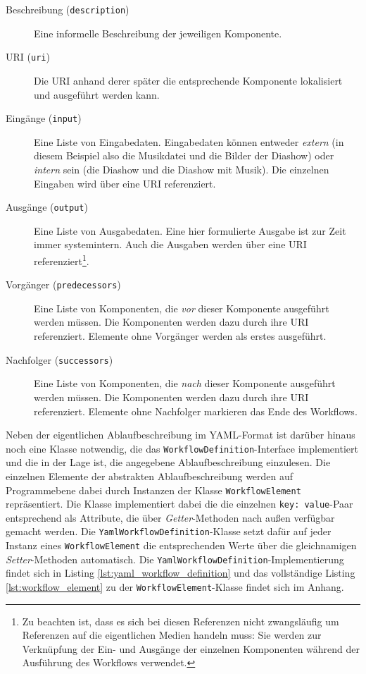   \begin{description}
    \item[Beschreibung (\texttt{description})] Eine informelle Beschreibung der jeweiligen Komponente.
    \item[URI (\texttt{uri})] Die URI anhand derer später die entsprechende Komponente lokalisiert und ausgeführt werden kann.
    \item[Eingänge (\texttt{input})] Eine Liste von Eingabedaten. Eingabedaten können entweder \emph{extern} (in diesem Beispiel also die Musikdatei und die Bilder der Diashow) oder \emph{intern} sein (die Diashow und die Diashow mit Musik). Die einzelnen Eingaben wird über eine URI referenziert.
    \item[Ausgänge (\texttt{output})] Eine Liste von Ausgabedaten. Eine hier formulierte Ausgabe ist zur Zeit immer systemintern. Auch die Ausgaben werden über eine URI referenziert\footnote{Zu beachten ist, dass es sich bei diesen Referenzen nicht zwangsläufig um Referenzen auf die eigentlichen Medien handeln muss: Sie werden zur Verknüpfung der Ein- und Ausgänge der einzelnen Komponenten während der Ausführung des Workflows verwendet.}.
    \item[Vorgänger (\texttt{predecessors})] Eine Liste von Komponenten, die \emph{vor} dieser Komponente ausgeführt werden müssen. Die Komponenten werden dazu durch ihre URI referenziert. Elemente ohne Vorgänger werden als erstes ausgeführt.
    \item[Nachfolger (\texttt{successors})] Eine Liste von Komponenten, die \emph{nach} dieser Komponente ausgeführt werden müssen. Die Komponenten werden dazu durch ihre URI referenziert. Elemente ohne Nachfolger markieren das Ende des Workflows.
  \end{description}

  Neben der eigentlichen Ablaufbeschreibung im YAML-Format ist darüber hinaus noch eine Klasse notwendig, die das \verb!WorkflowDefinition!-Interface implementiert und die in der Lage ist, die angegebene Ablaufbeschreibung einzulesen. Die einzelnen Elemente der abstrakten Ablaufbeschreibung werden auf Programmebene dabei durch Instanzen der Klasse \verb!WorkflowElement! repräsentiert. Die Klasse implementiert dabei die die einzelnen \verb!key: value!-Paar entsprechend als Attribute, die über \emph{Getter}-Methoden nach außen verfüg\-bar gemacht werden. Die \verb!YamlWorkflowDefinition!-Klasse setzt dafür auf jeder Instanz eines \verb!WorkflowElement! die entsprechenden Werte über die gleichnamigen \emph{Setter}-Methoden automatisch. Die \verb!YamlWorkflowDefinition!-Implementierung findet sich in Listing \ref{lst:yaml_workflow_definition} und das vollständige Listing \ref{lst:workflow_element} zu der \verb!WorkflowElement!-Klasse findet sich im Anhang.

